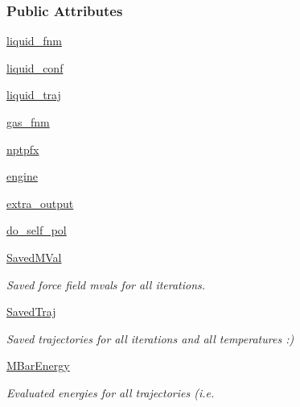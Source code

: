 \subsubsection*{Public Attributes}
\begin{DoxyCompactItemize}
\item 
\hyperlink{classforcebalance_1_1gmxio_1_1Liquid__GMX_a93aa835985645cb5bc38478923cb5696}{liquid\-\_\-fnm}
\item 
\hyperlink{classforcebalance_1_1gmxio_1_1Liquid__GMX_af86cd138d94f0d1ed8d70baf01976830}{liquid\-\_\-conf}
\item 
\hyperlink{classforcebalance_1_1gmxio_1_1Liquid__GMX_a3c56ce2033676d667a183772dbd9c050}{liquid\-\_\-traj}
\item 
\hyperlink{classforcebalance_1_1gmxio_1_1Liquid__GMX_a9a71d05c2c32e27dd94b1f917e20c685}{gas\-\_\-fnm}
\item 
\hyperlink{classforcebalance_1_1gmxio_1_1Liquid__GMX_a76010d532fa22a87abdd697ac4d03e8e}{nptpfx}
\item 
\hyperlink{classforcebalance_1_1gmxio_1_1Liquid__GMX_a2d5bd477173807422906188c4656f200}{engine}
\item 
\hyperlink{classforcebalance_1_1gmxio_1_1Liquid__GMX_aca5d0542a379c6cc5dcf3dc83b44dc7b}{extra\-\_\-output}
\item 
\hyperlink{classforcebalance_1_1liquid_1_1Liquid_a2cf65dd56f058636e68a0b3bf2af210e}{do\-\_\-self\-\_\-pol}
\item 
\hyperlink{classforcebalance_1_1liquid_1_1Liquid_a5b9df1bf79a641156429e292f47b6afd}{Saved\-M\-Val}
\begin{DoxyCompactList}\small\item\em Saved force field mvals for all iterations. \end{DoxyCompactList}\item 
\hyperlink{classforcebalance_1_1liquid_1_1Liquid_a0da0c00cdc193c9c470d7e528043fb99}{Saved\-Traj}
\begin{DoxyCompactList}\small\item\em Saved trajectories for all iterations and all temperatures \-:) \end{DoxyCompactList}\item 
\hyperlink{classforcebalance_1_1liquid_1_1Liquid_a6c00a87ae43f535118b77d41af51a5d7}{M\-Bar\-Energy}
\begin{DoxyCompactList}\small\item\em Evaluated energies for all trajectories (i.\-e. \end{DoxyCompactList}\item 

\end{DoxyCompactItemize}
